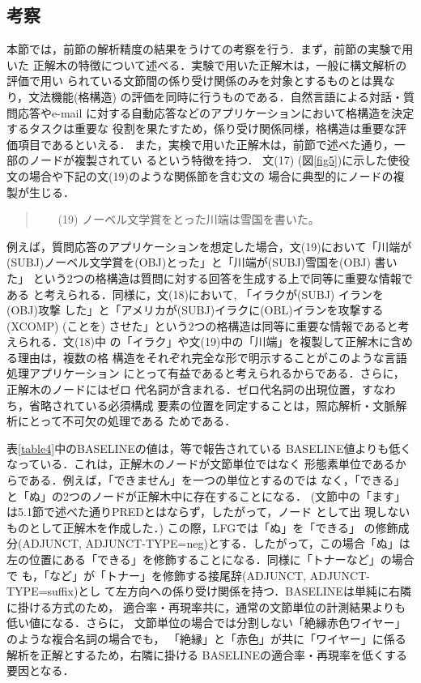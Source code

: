 \subsection{考察}
本節では，前節の解析精度の結果をうけての考察を行う．まず，前節の実験で用いた
正解木の特徴について述べる．実験で用いた正解木は，一般に構文解析の評価で用い
られている文節間の係り受け関係のみを対象とするものとは異なり，文法機能(格構造)
の評価を同時に行うものである．自然言語による対話・質問応答やe-mail
に対する自動応答などのアプリケーションにおいて格構造を決定するタスクは重要な
役割を果たすため，係り受け関係同様，格構造は重要な評価項目であるといえる．
また，実検で用いた正解木は，前節で述べた通り，一部のノードが複製されてい
るという特徴を持つ．
文(17) (図\ref{fig5})に示した使役文の場合や下記の文(19)のような関係節を含む文の
場合に典型的にノードの複製が生じる．
\begin{quote}
\begin{itemize}
\item[(19)] ノーベル文学賞をとった川端は雪国を書いた。
\end{itemize}
\end{quote}
例えば，質問応答のアプリケーションを想定した場合，文(19)において「川端が
(SUBJ)ノーベル文学賞を(OBJ)とった」と「川端が(SUBJ)雪国を(OBJ) 書いた」
という2つの格構造は質問に対する回答を生成する上で同等に重要な情報である
と考えられる．同様に，文(18)において, 「イラクが(SUBJ) イランを(OBJ)攻撃
した」と「アメリカが(SUBJ)イラクに(OBL)イランを攻撃する(XCOMP) (ことを)
させた」という2つの格構造は同等に重要な情報であると考えられる．文(18)中
の「イラク」や文(19)中の「川端」を複製して正解木に含める理由は，複数の格
構造をそれぞれ完全な形で明示することがこのような言語処理アプリケーション
にとって有益であると考えられるからである．さらに，正解木のノードにはゼロ
代名詞が含まれる．ゼロ代名詞の出現位置，すなわち，省略されている必須構成
要素の位置を同定することは，照応解析・文脈解析にとって不可欠の処理である
ためである．

表\ref{table4}中のBASELINEの値は，\cite{mitsuishi1998}等で報告されている
BASELINE値よりも低くなっている．これは，正解木のノードが文節単位ではなく
形態素単位であるからである．例えば，「できません」を一つの単位とするのでは
なく，「できる」と「ぬ」の2つのノードが正解木中に存在することになる．
(文節中の「ます」は5.1節で述べた通りPREDとはならず，したがって，ノード
として出
現しないものとして正解木を作成した．) この際，LFGでは「ぬ」を「できる」
の修飾成分(ADJUNCT, ADJUNCT-TYPE=neg)とする．したがって，この場合「ぬ」は
左の位置にある「できる」を修飾することになる．同様に「トナーなど」の場合で
も，「など」が「トナー」を修飾する接尾辞(ADJUNCT, ADJUNCT-TYPE=suffix)とし
て左方向への係り受け関係を持つ．BASELINEは単純に右隣に掛ける方式のため，
適合率・再現率共に，通常の文節単位の計測結果よりも低い値になる．さらに，
文節単位の場合では分割しない「絶縁赤色ワイヤー」のような複合名詞の場合でも，
「絶縁」と「赤色」が共に「ワイヤー」に係る解析を正解とするため，右隣に掛ける
BASELINEの適合率・再現率を低くする要因となる．

